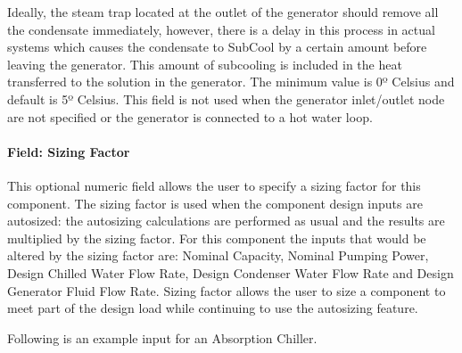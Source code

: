 Ideally, the steam trap located at the outlet of the generator should remove all the condensate immediately, however, there is a delay in this process in actual systems which causes the condensate to SubCool by a certain amount before leaving the generator. This amount of subcooling is included in the heat transferred to the solution in the generator. The minimum value is 0º Celsius and default is 5º Celsius. This field is not used when the generator inlet/outlet node are not specified or the generator is connected to a hot water loop.

\paragraph{Field: Sizing Factor}\label{field-sizing-factor-001}

This optional numeric field allows the user to specify a sizing factor for this component. The sizing factor is used when the component design inputs are autosized: the autosizing calculations are performed as usual and the results are multiplied by the sizing factor. For this component the inputs that would be altered by the sizing factor are: Nominal Capacity, Nominal Pumping Power, Design Chilled Water Flow Rate, Design Condenser Water Flow Rate and Design Generator Fluid Flow Rate. Sizing factor allows the user to size a component to meet part of the design load while continuing to use the autosizing feature.

Following is an example input for an Absorption Chiller.

